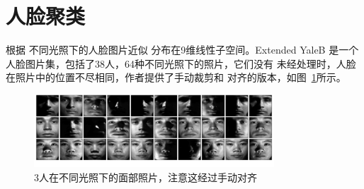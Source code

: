 \documentclass[main.tex]{subfiles}
\begin{document}
\section{人脸聚类}

根据 \cite{basri2003lambertianface} 不同光照下的人脸图片近似
分布在9维线性子空间。Extended YaleB \cite{lee2005extendedyalb}
是一个人脸图片集，包括了38人，64种不同光照下的照片，它们没有
未经处理时，人脸在照片中的位置不尽相同，作者提供了手动裁剪和
对齐的版本，如图~\ref{fig:yaleb}所示。
\begin{figure}[h]
  \centering
  \includegraphics[width=0.8\textwidth]{pics/yaleb}
  \caption{3人在不同光照下的面部照片，注意这经过手动对齐}
  \label{fig:yaleb}
\end{figure}
\end{document}
